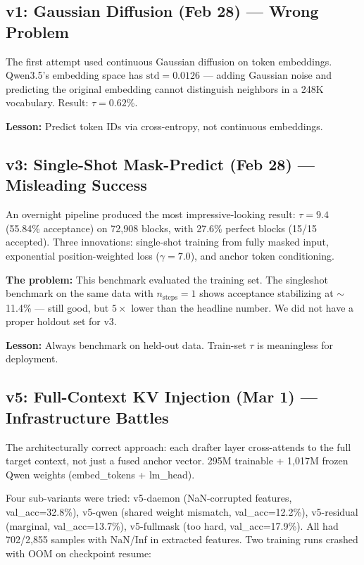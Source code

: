 \documentclass[10pt,a4paper]{article}
\begin{document}
\subsection{v1: Gaussian Diffusion (Feb 28) --- Wrong Problem}

The first attempt used continuous Gaussian diffusion on token embeddings. Qwen3.5's embedding space has $\text{std}{=}0.0126$ --- adding Gaussian noise and predicting the original embedding cannot distinguish neighbors in a 248K vocabulary. Result: $\tau{=}0.62\%$.

\textbf{Lesson:} Predict token IDs via cross-entropy, not continuous embeddings.

\subsection{v3: Single-Shot Mask-Predict (Feb 28) --- Misleading Success}

An overnight pipeline produced the most impressive-looking result: $\tau{=}9.4$ (55.84\% acceptance) on 72{,}908 blocks, with 27.6\% perfect blocks (15/15 accepted). Three innovations: single-shot training from fully masked input, exponential position-weighted loss ($\gamma{=}7.0$), and anchor token conditioning.

\textbf{The problem:} This benchmark evaluated the training set. The singleshot benchmark on the same data with $n_\text{steps}{=}1$ shows acceptance stabilizing at $\sim$11.4\% --- still good, but $5{\times}$ lower than the headline number. We did not have a proper holdout set for v3.

\textbf{Lesson:} Always benchmark on held-out data. Train-set $\tau$ is meaningless for deployment.

\subsection{v5: Full-Context KV Injection (Mar 1) --- Infrastructure Battles}

The architecturally correct approach: each drafter layer cross-attends to the full target context, not just a fused anchor vector. 295M trainable + 1{,}017M frozen Qwen weights (embed\_tokens + lm\_head).

Four sub-variants were tried: v5-daemon (NaN-corrupted features, val\_acc=32.8\%), v5-qwen (shared weight mismatch, val\_acc=12.2\%), v5-residual (marginal, val\_acc=13.7\%), v5-fullmask (too hard, val\_acc=17.9\%). All had 702/2{,}855 samples with NaN/Inf in extracted features. Two training runs crashed with OOM on checkpoint resume:
\end{document}
